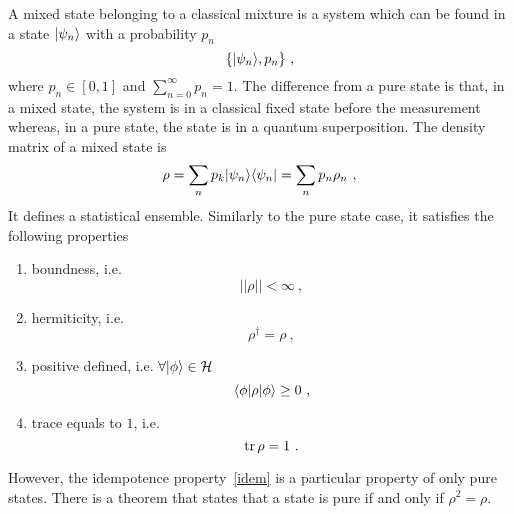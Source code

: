     A mixed state belonging to a classical mixture is a system which can be found in a state $\vert\psi_n\rangle$ with a probability $p_n$
    \begin{equation*}
        \{\vert\psi_n\rangle, p_n\} ~,
    \end{equation*}
    where $p_n \in [0, 1]$ and $\sum_{n=0}^{\infty} p_n = 1$. The difference from a pure state is that, in a mixed state, the system is in a classical fixed state before the measurement whereas, in a pure state, the state is in a quantum superposition. The density matrix of a mixed state is 
    \begin{equation}\label{mix}
        \rho = \sum_n p_k \vert\psi_n\rangle \langle\psi_n\vert = \sum_n p_n \rho_n ~,
    \end{equation}
    It defines a statistical ensemble. Similarly to the pure state case, it satisfies the following properties
    \begin{enumerate}
        \item boundness, i.e. 
            \begin{equation*}
                ||\rho|| < \infty~,
            \end{equation*}
        \item hermiticity, i.e. 
            \begin{equation*}
                \rho^\dagger = \rho ~,
            \end{equation*}
        \item positive defined, i.e. $\forall \vert\phi\rangle \in \mathcal H$
            \begin{equation*}
                \langle\phi\vert \rho \vert\phi\rangle \geq 0 ~,
            \end{equation*}
        \item trace equals to $1$, i.e. 
            \begin{equation*}
                \operatorname{tr} \rho = 1 ~.
            \end{equation*}
    \end{enumerate}
    However, the idempotence property~\eqref{idem} is a particular property of only pure states. There is a theorem that states that a state is pure if and only if $\rho^2 = \rho$.
